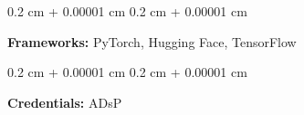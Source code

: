 \documentclass[10pt, letterpaper]{article}
\newenvironment{onecolentry}{
    \begin{adjustwidth}{
        0.2 cm + 0.00001 cm
    }{
        0.2 cm + 0.00001 cm
    }
}{
    \end{adjustwidth}
} %
\begin{document}
        \vspace{0.2 cm}

        \begin{onecolentry}
            \textbf{Frameworks:} PyTorch, Hugging Face, TensorFlow
        \end{onecolentry}

        \vspace{0.2 cm}
        
        \begin{onecolentry}
            \textbf{Credentials:} ADsP
        \end{onecolentry}


\end{document}

